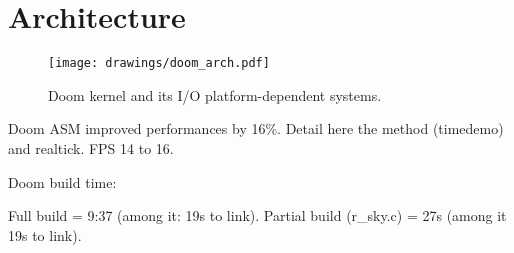 \section{Architecture}
\begin{figure}[H]
\centering
\texttt{[image: drawings/doom\_arch.pdf]}
\caption{Doom kernel and its I/O platform-dependent systems.}
\end{figure}
\par

Doom ASM improved performances by 16\%. Detail here the method (timedemo) and realtick. FPS 14 to 16.\\
\par

Doom build time: \\
\par

Full build = 9:37 (among it: 19s to link).
Partial build (r\_sky.c) = 27s (among it 19s to link).